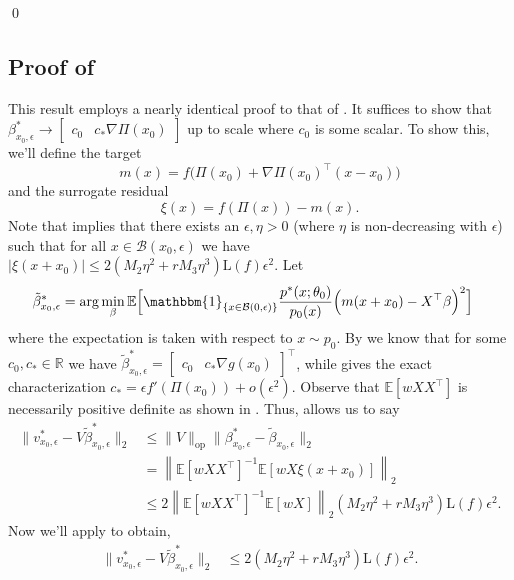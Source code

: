 \documentclass[11pt]{article}
\begin{document}
\qed{}

\subsection{Proof of } \label{proof of population prop curve}

This result employs a nearly identical proof to that of . It suffices to show that $\beta^*_{x_0, \epsilon} \rightarrow  \begin{bmatrix}c_0 &  c_*\nabla \Pi(x_0)\end{bmatrix}$ up to scale where $c_0$ is some scalar. To show this, we'll define the  target  
\[m(x) = f\Big(\Pi(x_0) + \nabla \Pi(x_0)^{\top}(x-x_0)\Big)\]
and the surrogate residual 
\[\xi(x) = f(\Pi(x)) - m(x).\] Note that  implies that there exists an $\epsilon, \eta > 0$ (where $\eta$ is non-decreasing with $\epsilon$) such that for all $x \in \mathcal{B}(x_0, \epsilon)$ we have $|\xi(x + x_0)| \le 2(M_2\eta^2+rM_3\eta^3)\text{L}(f)\epsilon^2$. Let  
\begin{align}
    \tilde{\beta}^*_{x_0, \epsilon} &= \arg\min_{\beta}\mathbb{E}\Big[\mathbbm{1}_{\{x \in \mathcal{B}(0, \epsilon)\}}\frac{p^*(x;\theta_0)}{p_{0}(x)}\Big(m(x+x_0) - X^{\top}\beta\Big)^2\Big] \label{eq: perturbed pop estimator}
\end{align}
where the expectation is taken with respect to $x \sim p_0$. By  we know that for some $c_0, c_* \in \mathbb{R}$ we have $\tilde{\beta}^*_{x_0, \epsilon}  =  \begin{bmatrix}
    c_0 & c_*\nabla g(x_0)
\end{bmatrix}^{\top}$, while  gives the exact characterization $c_* = \epsilon f'(\Pi(x_0))+ o(\epsilon^2)$. Observe that $\mathbb{E}[wXX^{\top}]$ is necessarily positive definite as shown in . Thus,  allows us to say 
\begin{align*} 
\|v^*_{x_0, \epsilon} - V\tilde{\beta}_{x_0, \epsilon}^*\|_2 &\leq \|V\|_{\text{op}}\|\beta^*_{x_0, \epsilon} - \tilde\beta_{x_0, \epsilon}\|_2\\
&= \left\|\mathbb{E}[wXX^{\top}]^{-1}\mathbb{E}[wX\xi(x+x_0)]\right\|_2 \\
&\leq 2\left\|\mathbb{E}[wXX^{\top}]^{-1}\mathbb{E}[wX]\right\|_2(M_2\eta^2+rM_3\eta^3)\text{L}(f)\epsilon^2.
\end{align*}
Now we'll apply  to obtain,
\begin{align}
    \|v^*_{x_0, \epsilon} - V\tilde{\beta}_{x_0, \epsilon}^*\|_2 &\le 2(M_2\eta^2+rM_3\eta^3)\text{L}(f)\epsilon^2.
\end{align}
\end{document}
